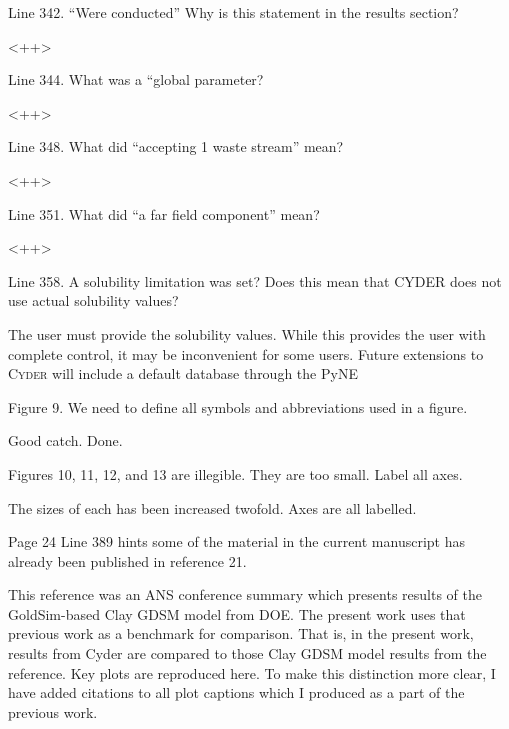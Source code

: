 \documentclass[answers,12pt]{exam}
\newcommand{\Cyder}{\textsc{Cyder}\xspace}%
\begin{document}
\begin{questions}
 

\question Line 342. “Were conducted” Why is this statement in the results section?
\begin{solution}
<++>
\end{solution}

 

\question Line 344. What was a “global parameter?
\begin{solution}
<++>
\end{solution}

 

\question Line 348. What did “accepting 1 waste stream” mean?
\begin{solution}
<++>
\end{solution}

 

\question Line 351. What did “a far field component” mean?
\begin{solution}
<++>
\end{solution}

 

\question Line 358. A solubility limitation was set? Does this mean that CYDER does not use actual solubility values?
\begin{solution}
The user must provide the solubility values. While this provides the user with 
        complete control, it may be inconvenient for some users. Future extensions to \Cyder will 
        include a default database through the PyNE
\end{solution}

 

\question Figure 9. We need to define all symbols and abbreviations used in a figure.
\begin{solution}
Good catch. Done.
\end{solution}

 

\question Figures 10, 11, 12, and 13 are illegible. They are too small. Label all axes.
\begin{solution}
The sizes of each has been increased twofold. Axes are all labelled. 
\end{solution}

\question Page 24 Line 389 hints some of the material in the current manuscript has already been published in reference 21.
\begin{solution}
        This reference was an ANS conference summary which presents results of 
        the GoldSim-based Clay GDSM model from DOE. The present work uses that 
        previous work as a benchmark for comparison. That is, in the present 
        work, results from Cyder are compared to those Clay GDSM model results 
        from the reference. Key plots are reproduced here. To make this 
        distinction more clear, I have added citations to all plot captions 
        which I produced as a part of the previous work.
\end{solution}



\end{questions}
\end{document}
